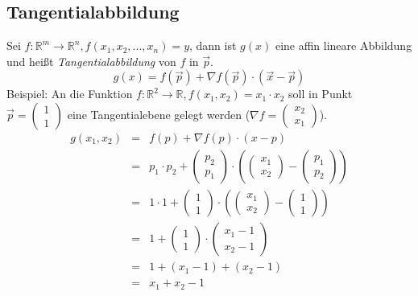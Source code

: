 \subsection{Tangentialabbildung} %
\label{sub:tangentialabbildung}
Sei $f : \mathbb{R}^m \rightarrow \mathbb{R}^n, f(x_1,x_2,...,x_n) = y$, dann ist $g(x)$ eine affin lineare Abbildung und heißt
\emph{Tangentialabbildung} von $f$ in $\overrightarrow{p}$.
\begin{equation}
	g(x) = f(\overrightarrow{p}) + \nabla f(\overrightarrow{p})\cdot(\overrightarrow{x}-\overrightarrow{p})
\end{equation}
Beispiel: An die Funktion $f : \mathbb{R}^2 \rightarrow \mathbb{R}, f(x_1,x_2) = x_1 \cdot x_2$ soll in Punkt $\overrightarrow{p} = 
\left(\begin{array}{c}1\\1\end{array}\right)$ eine Tangentialebene gelegt werden 
($\nabla f = \left(\begin{array}{c}x_2\\x_1\end{array}\right)$). 
\begin{eqnarray*}
	g(x_1,x_2) &=& f(p) + \nabla f(p) \cdot (x-p) \\
	&=& p_1\cdot p_2 + \left(\begin{array}{c}p_2\\p_1\end{array}\right) \cdot
	 \left(\left(\begin{array}{c}x_1\\x_2\end{array}\right) - \left(\begin{array}{c}p_1\\p_2\end{array}\right) \right) \\
	&=& 1 \cdot 1 + \left(\begin{array}{c}1\\1\end{array}\right) \cdot \left(\left(\begin{array}{c}x_1\\x_2\end{array}\right)
	 - \left(\begin{array}{c}1\\1\end{array}\right) \right) \\
	&=& 1 + \left(\begin{array}{c}1\\1\end{array}\right) \cdot \left(\begin{array}{c}x_1 - 1\\x_2 - 1\end{array}\right) \\
	&=& 1+(x_1-1)+(x_2-1) \\
	&=& x_1 + x_2 -1
\end{eqnarray*}

